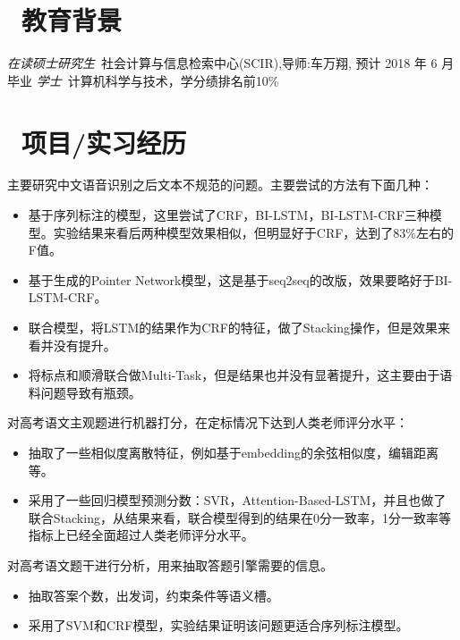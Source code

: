 \documentclass{resume}
\begin{document}


\section{\faGraduationCap\  教育背景}
\textit{在读硕士研究生}\ 社会计算与信息检索中心(SCIR),导师:车万翔, 预计 2018 年 6 月毕业
\textit{学士}\ 计算机科学与技术，学分绩排名前10\%

\section{\faUsers\ 项目/实习经历}
主要研究中文语音识别之后文本不规范的问题。主要尝试的方法有下面几种：
\begin{itemize}
  \item 基于序列标注的模型，这里尝试了CRF，BI-LSTM，BI-LSTM-CRF三种模型。实验结果来看后两种模型效果相似，但明显好于CRF，达到了83\%左右的F值。
  \item 基于生成的Pointer Network模型，这是基于seq2seq的改版，效果要略好于BI-LSTM-CRF。
  \item 联合模型，将LSTM的结果作为CRF的特征，做了Stacking操作，但是效果来看并没有提升。
  \item 将标点和顺滑联合做Multi-Task，但是结果也并没有显著提升，这主要由于语料问题导致有瓶颈。
\end{itemize}


\begin{onehalfspacing}
对高考语文主观题进行机器打分，在定标情况下达到人类老师评分水平：
\begin{itemize}
  \item 抽取了一些相似度离散特征，例如基于embedding的余弦相似度，编辑距离等。
  \item 采用了一些回归模型预测分数：SVR，Attention-Based-LSTM，并且也做了联合Stacking，从结果来看，联合模型得到的结果在0分一致率，1分一致率等指标上已经全面超过人类老师评分水平。
\end{itemize} 
\end{onehalfspacing}

\begin{onehalfspacing}
	对高考语文题干进行分析，用来抽取答题引擎需要的信息。
	\begin{itemize}
		\item 抽取答案个数，出发词，约束条件等语义槽。
		\item 采用了SVM和CRF模型，实验结果证明该问题更适合序列标注模型。
	\end{itemize} 
\end{onehalfspacing}
\end{document}
